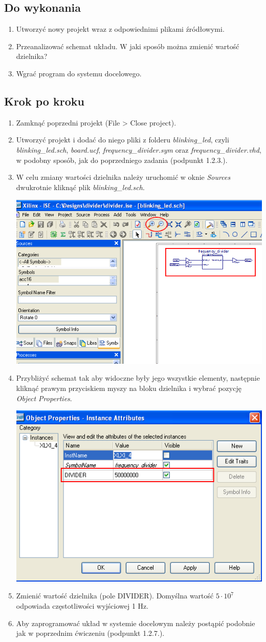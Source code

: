 \documentclass[12pt]{article}
\begin{document}
\subsection{Do wykonania}
\begin{enumerate}[wide, labelwidth=!, labelindent=0pt]
\item Utworzyć nowy projekt wraz z odpowiednimi plikami źródłowymi.
\item Przeanalizować schemat układu. W jaki sposób można zmienić wartość dzielnika?
\item Wgrać program do systemu docelowego.
\end{enumerate}
\subsection{Krok po kroku}
\begin{enumerate}[wide, labelwidth=!, labelindent=0pt]
\item Zamknąć poprzedni projekt (File > Close project).
\item Utworzyć projekt i dodać do niego pliki z folderu \textit{blinking\_led}, czyli \textit{blinking\_led.sch}, \textit{board.ucf}, \textit{frequency\_divider.sym} oraz \textit{frequency\_divider.vhd}, w podobny sposób, jak do poprzedniego zadania (podpunkt 1.2.3.).
\item W celu zmiany wartości dzielnika należy uruchomić w oknie \textit{Sources} dwukrotnie kliknąć plik \textit{blinking\_led.sch}.\\
\centerline{\includegraphics[width=0.5\linewidth]{2_1.png}}
\item Przybliżyć schemat tak aby widoczne były jego wszystkie elementy, następnie kliknąć prawym przyciskiem myszy na bloku dzielnika i wybrać pozycję \textit{Object Properties}.\\
\centerline{\includegraphics[width=0.5\linewidth]{2_2.png}}
\item Zmienić wartość dzielnika (pole DIVIDER). Domyślna wartość $5\cdot 10^{7}$ odpowiada częstotliwości wyjściowej 1 Hz.
\item Aby zaprogramować układ w systemie docelowym należy postąpić podobnie jak w poprzednim ćwiczeniu (podpunkt 1.2.7.).
\end{enumerate}
\end{document}
